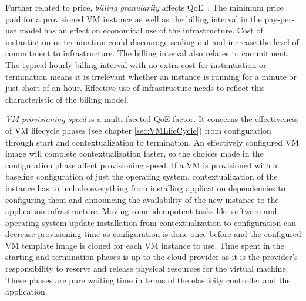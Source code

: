 \documentclass[english]{tktltiki2}
\theoremstyle{definition}
\theoremstyle{remark}
\begin{document}
Further related to price, \textit{billing granularity} affects
QoE~\cite{Brebner2012a}\cite{Islam2012}\cite{Mao2011}\cite{VandenBossche2010}.
The minimum price paid for a provisioned VM instance as well as the billing
interval in the pay-per-use model has an effect on economical use of the
infrastructure. Cost of instantiation or termination could discourage scaling
out and increase the level of commitment to infrastructure. The billing interval
also relates to commitment. The typical hourly billing interval with no extra
cost for instantiation or termination means it is irrelevant whether an instance
is running for a minute or just short of an hour. Effective use of
infrastructure needs to reflect this characteristic of the billing model.

\textit{VM provisioning speed} is a multi-faceted QoE factor. It concerns the
effectiveness of VM lifecycle phases (see chapter \ref{sec:VMLifeCycle}) from
configuration through start and contextualization to termination. An effectively
configured VM image will complete contextualization faster, so the choices made
in the configuration phase affect provisioning speed. If a VM is provisioned
with a baseline configuration of just the operating system, contextualization of
the instance has to include everything from installing application dependencies
to configuring them and announcing the availability of the new instance to the
application infrastructure. Moving some idempotent tasks like software and
operating system update installation from contextualization to configuration can
decrease provisioning time as configuration is done once before and the
configured VM template image is cloned for each VM instance to use. Time spent
in the starting and termination phases is up to the cloud provider as it is the
provider's responsibility to reserve and release physical resources for the
virtual machine. These phases are pure waiting time in terms of the elasticity
controller and the application.
\end{document}
